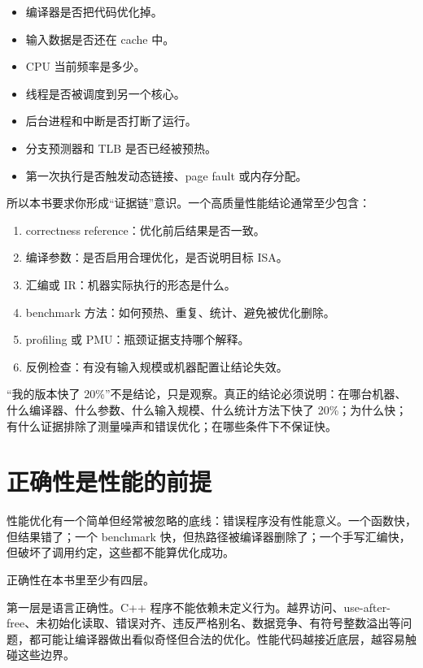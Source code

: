 \begin{itemize}
  \item 编译器是否把代码优化掉。
  \item 输入数据是否还在 cache 中。
  \item CPU 当前频率是多少。
  \item 线程是否被调度到另一个核心。
  \item 后台进程和中断是否打断了运行。
  \item 分支预测器和 TLB 是否已经被预热。
  \item 第一次执行是否触发动态链接、page fault 或内存分配。
\end{itemize}

所以本书要求你形成“证据链”意识。一个高质量性能结论通常至少包含：

\begin{enumerate}
  \item correctness reference：优化前后结果是否一致。
  \item 编译参数：是否启用合理优化，是否说明目标 ISA。
  \item 汇编或 IR：机器实际执行的形态是什么。
  \item benchmark 方法：如何预热、重复、统计、避免被优化删除。
  \item profiling 或 PMU：瓶颈证据支持哪个解释。
  \item 反例检查：有没有输入规模或机器配置让结论失效。
\end{enumerate}

\begin{warningbox}
“我的版本快了 20\%”不是结论，只是观察。真正的结论必须说明：在哪台机器、什么编译器、什么参数、什么输入规模、什么统计方法下快了 20\%；为什么快；有什么证据排除了测量噪声和错误优化；在哪些条件下不保证快。
\end{warningbox}

\section{正确性是性能的前提}

性能优化有一个简单但经常被忽略的底线：错误程序没有性能意义。一个函数快，但结果错了；一个 benchmark 快，但热路径被编译器删除了；一个手写汇编快，但破坏了调用约定，这些都不能算优化成功。

正确性在本书里至少有四层。

第一层是语言正确性。C++ 程序不能依赖未定义行为。越界访问、use-after-free、未初始化读取、错误对齐、违反严格别名、数据竞争、有符号整数溢出等问题，都可能让编译器做出看似奇怪但合法的优化。性能代码越接近底层，越容易触碰这些边界。

